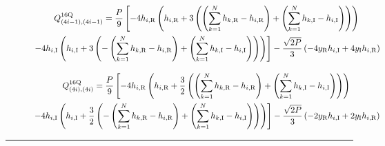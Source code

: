  \begin{figure}[H]
	\begin{multline}
		\label{16q_Q_4i_minus_1_both}
		Q_{(4i-1),(4i-1)}^{16{\rm Q}} = \frac{P}{9} \left[ 
		-4 h_{i,{\rm R}} \left( h_{i,{\rm R}} + 3 \left(  \left( \sum_{k=1}^{N} h_{k,{\rm R}} - h_{i,{\rm R}} \right) + \left( \sum_{k=1}^{N} h_{k,{\rm I}} - h_{i,{\rm I}} \right)
		\right) \right)
		\right. \\
		\left.
		-4 h_{i,{\rm I}} \left( h_{i,{\rm I}} + 3 \left( - \left( \sum_{k=1}^{N} h_{k,{\rm R}} - h_{i,{\rm R}} \right) + \left( \sum_{k=1}^{N} h_{k,{\rm I}} - h_{i,{\rm I}} \right)
		\right) \right) 
		\right] 
		- \frac{\sqrt{2 P}}{3}\left( -4 y_{\rm R} h_{i,{\rm I}} + 4 y_{\rm I} h_{i,{\rm R}} \right)
	\end{multline}
 \end{figure}
 \begin{figure}
	\begin{multline}
		\label{16q_Q_4i_both}
		Q_{(4i),(4i)}^{16{\rm Q}} = \frac{P}{9} \left[ 
		-4 h_{i,{\rm R}} \left( h_{i,{\rm R}} + \frac{3}{2} \left(  \left( \sum_{k=1}^{N} h_{k,{\rm R}} - h_{i,{\rm R}} \right) + \left( \sum_{k=1}^{N} h_{k,{\rm I}} - h_{i,{\rm I}} \right)
		\right) \right)
		\right. \\
		\left.
		-4 h_{i,{\rm I}} \left( h_{i,{\rm I}} + \frac{3}{2} \left( - \left( \sum_{k=1}^{N} h_{k,{\rm R}} - h_{i,{\rm R}} \right) + \left( \sum_{k=1}^{N} h_{k,{\rm I}} - h_{i,{\rm I}} \right)
		\right) \right) 
		\right] 
		- \frac{\sqrt{2 P}}{3}\left( -2 y_{\rm R} h_{i,{\rm I}} + 2 y_{\rm I} h_{i,{\rm R}} \right)
	\end{multline}
	
\end{figure}
\hrule
